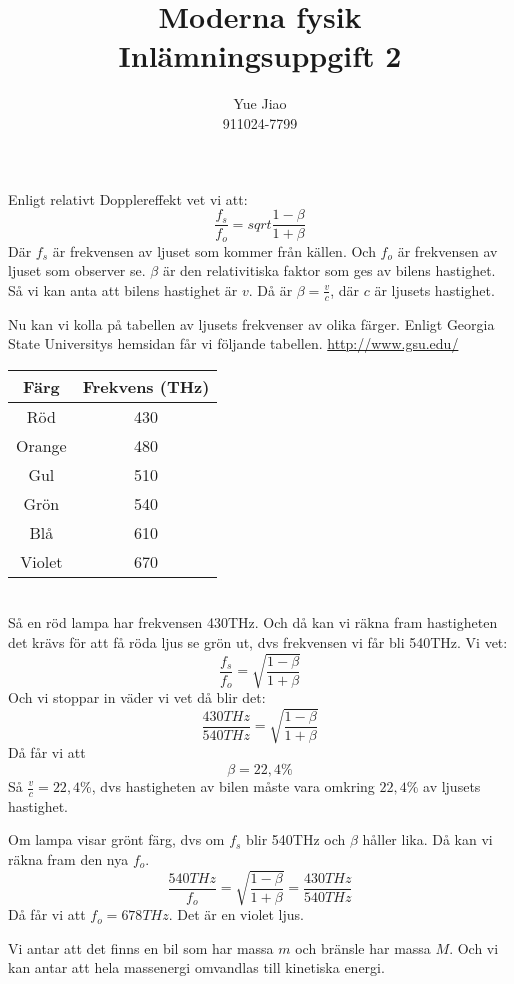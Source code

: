 \documentclass[a4paper,12pt]{article}
\author{Yue Jiao \\ 911024-7799}
\title{ {\Large \textbf{ Moderna fysik \\ Inlämningsuppgift 2} }}
\date{}
\begin{document}
\maketitle
Enligt relativt Dopplereffekt vet vi att:
$$
\frac{f_s}{f_o} = sqrt{\frac{1-\beta}{1+\beta}}
$$
Där $f_s$ är frekvensen av ljuset som kommer från källen. 
Och $f_o$ är frekvensen av ljuset som observer se. 
$\beta$ är den relativitiska faktor som ges av bilens hastighet. 
Så vi kan anta att bilens hastighet är $v$. 
Då är $\beta = \frac{v}{c}$, där $c$ är ljusets hastighet. 

Nu kan vi kolla på tabellen av ljusets frekvenser av olika färger. 
Enligt Georgia State Universitys hemsidan får vi följande tabellen. 
\url{http://www.gsu.edu/} 
{
  \centering
  \begin{tabular}[t]{ | c | c | }
    \hline
    Färg & Frekvens (THz) \\
    \hline
    Röd & 430 \\
    Orange & 480 \\
    Gul & 510 \\
    Grön & 540 \\
    Blå & 610 \\
    Violet & 670 \\
    \hline  
  \end{tabular}
}\\

Så en röd lampa har frekvensen 430THz. 
Och då kan vi räkna fram hastigheten det krävs för att få röda ljus se grön ut, dvs frekvensen vi får bli 540THz. 
Vi vet: 
$$
\frac{f_s}{f_o} = \sqrt{\frac{1-\beta}{1+\beta}}
$$
Och vi stoppar in väder vi vet då blir det:
$$
\frac{430THz}{540THz} = \sqrt{\frac{1-\beta}{1+\beta}}
$$
Då får vi att 
$$
\beta = 22,4\%
$$
Så $\frac{v}{c} = 22,4\%$, dvs hastigheten av bilen måste vara omkring $22,4\%$ av ljusets hastighet. 

Om lampa visar grönt färg, dvs om $f_s$ blir 540THz och $\beta$ håller lika. 
Då kan vi räkna fram den nya $f_o$. 
$$
\frac{540THz}{f_o} = \sqrt{\frac{1-\beta}{1+\beta}} = \frac{430THz}{540THz}
$$
Då får vi att $f_o = 678THz$. Det är en violet ljus. 

Vi antar att det finns en bil som har massa $m$ och bränsle har massa $M$. 
Och vi kan antar att hela massenergi omvandlas till kinetiska energi. 
\end{document}
